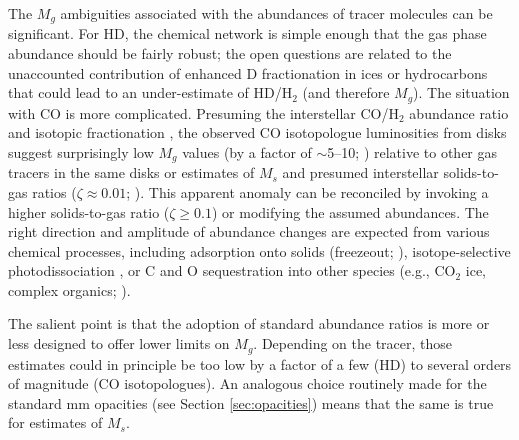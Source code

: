 \documentclass[a4paper]{ar-1col}
\begin{document}

The $M_g$ ambiguities associated with the abundances of tracer molecules can be significant.  For HD, the  chemical network is simple enough that the gas phase abundance should be fairly robust; the open questions are related to the unaccounted contribution of enhanced D fractionation in ices or hydrocarbons that could lead to an under-estimate of HD/H$_2$ (and therefore $M_g$).  The situation with CO is more complicated.  Presuming the interstellar CO/H$_2$ abundance ratio and isotopic fractionation \citep{frerking82}, the observed CO isotopologue luminosities from disks suggest surprisingly low $M_g$ values (by a factor of $\sim$5--10; \citealt{williamsbest14}) relative to other gas tracers in the same disks \citep{chapillon10,favre13,kama16a} or estimates of $M_s$ and presumed interstellar solids-to-gas ratios ($\zeta \approx 0.01$; \citealt{kastner97,dutrey03,ansdell16,long17}).  This apparent anomaly can be reconciled by invoking a higher solids-to-gas ratio ($\zeta \ge 0.1$) or modifying the assumed abundances.  The right direction and amplitude of abundance changes are expected from various chemical processes, including adsorption onto solids (freezeout; \citealt{aikawa97,aikawa02,dutrey97}), isotope-selective photodissociation \citep{visser09,miotello14,miotello16}, or C and O sequestration into other species (e.g., CO$_2$ ice, complex organics; \citealt{reboussin15,yu17a,miotello17,bosman18,dodson-robinson18}).

The salient point is that the adoption of standard abundance ratios is more or less designed to offer lower limits on $M_g$.  Depending on the tracer, those estimates could in principle be too low by a factor of a few (HD) to several orders of magnitude (CO isotopologues).  An analogous choice routinely made for the standard mm opacities (see Section \ref{sec:opacities}) means that the same is true for estimates of $M_s$.
\end{document}
